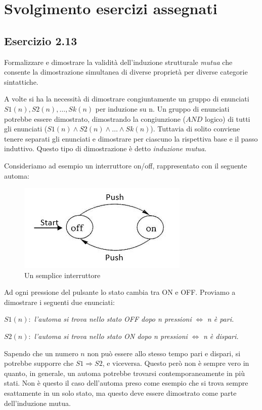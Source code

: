 \chapter{Svolgimento esercizi assegnati}
	\section{Esercizio 2.13}
		Formalizzare e dimostrare la validità dell'induzione strutturale
		\emph{mutua} che consente la dimostrazione simultanea di diverse proprietà
		per diverse categorie sintattiche.
		
		\sectionline
		
		A volte si ha la necessità di dimostrare congiuntamente un gruppo di
		enunciati $S1(n),S2(n),\ldots,Sk(n)$ per induzione su n. Un gruppo di
		enunciati potrebbe essere dimostrato, dimostrando la congiunzione ($AND$
		logico) di tutti gli enunciati ($S1(n)\land S2(n)\land \ldots \land Sk(n)$).
		Tuttavia di solito conviene tenere separati gli enunciati e dimostrare per
		ciascuno la rispettiva base e il passo induttivo. Questo tipo di dimostrazione
		è detto \emph{induzione mutua}.
		
		Consideriamo ad esempio un interruttore on/off, rappresentato con il seguente
		automa:
		
		\begin{figure}[h]
			\centering
			\includegraphics[scale=1]{img/Interruttore}
			\caption{Un semplice interruttore}
		\end{figure}
		
		Ad ogni pressione del pulsante lo stato cambia tra ON e OFF. Proviamo a
		dimostrare i seguenti due enunciati:
		
		$S1(n):$ \emph{l'automa si trova nello stato OFF dopo n pressioni}
		$\Leftrightarrow$ \emph{n è pari.}
		
		$S2(n):$ \emph{l'automa si trova nello stato ON dopo n pressioni}
		$\Leftrightarrow$ \emph{n è dispari.}
		
		Sapendo che un numero $n$ non può essere allo stesso tempo pari e dispari, si
		potrebbe supporre che $S1 \Rightarrow S2$, e viceversa. Questo però non è
		sempre vero in quanto, in generale, un automa potrebbe trovarsi
		contemporaneamente in più stati. Non è questo il caso dell'automa preso come
		esempio che si trova sempre esattamente in un solo stato, ma questo deve
		essere dimostrato come parte dell'induzione mutua.
		
